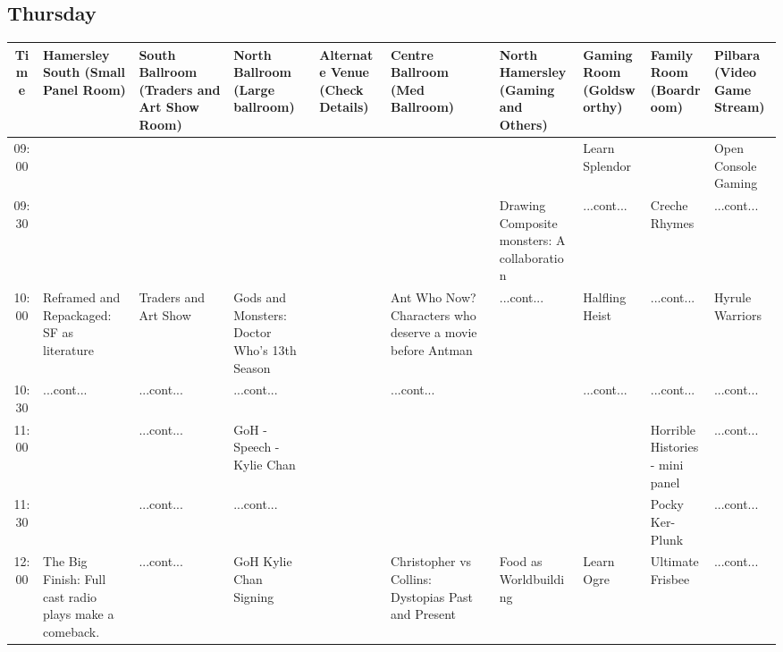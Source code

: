 \documentclass{scrreprt}
\begin{document}
\begin{landscape}
\subsection*{Thursday}\tiny
\begin{tabular}{c||p{25mm}|p{25mm}|p{25mm}|p{25mm}|p{25mm}|p{25mm}|p{25mm}|p{25mm}|p{25mm}|}
Time&Hamersley South (Small Panel Room)&South Ballroom (Traders and Art Show Room)&North Ballroom (Large ballroom)&Alternate Venue (Check Details)&Centre Ballroom (Med Ballroom)&North Hamersley (Gaming and Others)&Gaming Room (Goldsworthy)&Family Room (Boardroom)&Pilbara (Video Game Stream)\\
\hline
\hline
09:00&&&&&&&\cellcolor[gray]{0.667843} Learn Splendor&&\cellcolor[gray]{0.531727} Open Console Gaming\\
09:30&&&&&&\cellcolor[gray]{0.592703} Drawing Composite monsters: A collaboration&\cellcolor[gray]{0.667843} ...cont...&\cellcolor[gray]{0.668793} Creche Rhymes&\cellcolor[gray]{0.531727} ...cont...\\
10:00&\cellcolor[gray]{0.604796} Reframed and Repackaged: SF as literature&\cellcolor[gray]{0.625550} Traders and Art Show&\cellcolor[gray]{0.538831} Gods and Monsters: Doctor Who's 13th Season&&\cellcolor[gray]{0.636916} Ant Who Now? Characters who deserve a movie before Antman&\cellcolor[gray]{0.592703} ...cont...&\cellcolor[gray]{0.661855} Halfling Heist&\cellcolor[gray]{0.668793} ...cont...&\cellcolor[gray]{0.577648} Hyrule Warriors\\
10:30&\cellcolor[gray]{0.604796} ...cont...&\cellcolor[gray]{0.625550} ...cont...&\cellcolor[gray]{0.538831} ...cont...&&\cellcolor[gray]{0.636916} ...cont...&&\cellcolor[gray]{0.661855} ...cont...&\cellcolor[gray]{0.668793} ...cont...&\cellcolor[gray]{0.577648} ...cont...\\
11:00&&\cellcolor[gray]{0.625550} ...cont...&\cellcolor[gray]{0.855792} GoH - Speech - Kylie Chan&&&&&\cellcolor[gray]{0.604568} Horrible Histories - mini panel&\cellcolor[gray]{0.577648} ...cont...\\
11:30&&\cellcolor[gray]{0.625550} ...cont...&\cellcolor[gray]{0.855792} ...cont...&&&&&\cellcolor[gray]{0.865015} Pocky Ker-Plunk&\cellcolor[gray]{0.577648} ...cont...\\
12:00&\cellcolor[gray]{0.894270} The Big Finish: Full cast radio plays make a comeback.&\cellcolor[gray]{0.625550} ...cont...&\cellcolor[gray]{0.785977} GoH Kylie Chan Signing&&\cellcolor[gray]{0.501949} Christopher vs Collins: Dystopias Past and Present&\cellcolor[gray]{0.552033} Food as Worldbuilding&\cellcolor[gray]{0.537581} Learn Ogre&\cellcolor[gray]{0.973893} Ultimate Frisbee&\cellcolor[gray]{0.577648} ...cont...\\

\end{tabular}
\end{landscape}
\end{document}
